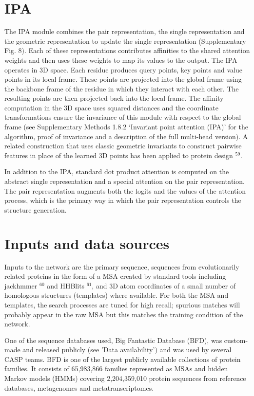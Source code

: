 \documentclass[10pt]{article}
\begin{document}
\section*{IPA}
The IPA module combines the pair representation, the single representation and the geometric representation to update the single representation (Supplementary Fig. 8). Each of these representations contributes affinities to the shared attention weights and then uses these weights to map its values to the output. The IPA operates in 3D space. Each residue produces query points, key points and value points in its local frame. These points are projected into the global frame using the backbone frame of the residue in which they interact with each other. The resulting points are then projected back into the local frame. The affinity computation in the 3D space uses squared distances and the coordinate transformations ensure the invariance of this module with respect to the global frame (see Supplementary Methods 1.8.2 ‘Invariant point attention (IPA)’ for the algorithm, proof of invariance and a description of the full multi-head version). A related construction that uses classic geometric invariants to construct pairwise features in place of the learned 3D points has been applied to protein design ${ }^{59}$.

In addition to the IPA, standard dot product attention is computed on the abstract single representation and a special attention on the pair representation. The pair representation augments both the logits and the values of the attention process, which is the primary way in which the pair representation controls the structure generation.

\section*{Inputs and data sources}
Inputs to the network are the primary sequence, sequences from evolutionarily related proteins in the form of a MSA created by standard tools including jackhmmer ${ }^{60}$ and HHBlits ${ }^{61}$, and 3D atom coordinates of a small number of homologous structures (templates) where available. For both the MSA and templates, the search processes are tuned for high recall; spurious matches will probably appear in the raw MSA but this matches the training condition of the network.

One of the sequence databases used, Big Fantastic Database (BFD), was custom-made and released publicly (see 'Data availability') and was used by several CASP teams. BFD is one of the largest publicly available collections of protein families. It consists of 65,983,866 families represented as MSAs and hidden Markov models (HMMs) covering 2,204,359,010 protein sequences from reference databases, metagenomes and metatranscriptomes.
\end{document}
